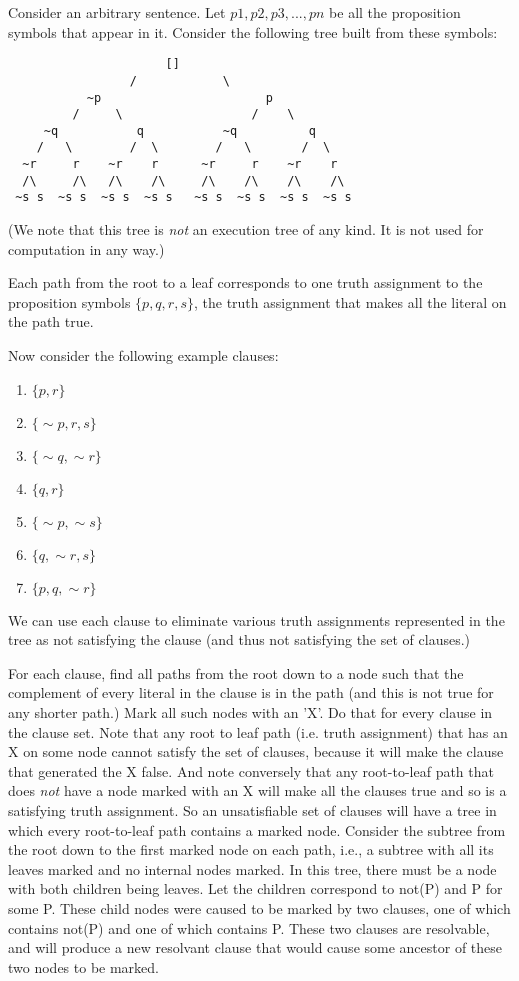 Consider an arbitrary sentence.  Let $p1, p2, p3, ..., pn$ be all the
proposition symbols that appear in it.  Consider the following tree
built from these symbols:

\begin{verbatim}
                      []
                 /            \
           ~p                       p
         /     \                  /    \
     ~q           q           ~q          q
    /   \        /  \        /   \       /  \
  ~r     r    ~r    r      ~r     r    ~r    r
  /\     /\   /\    /\     /\    /\    /\    /\
 ~s s  ~s s  ~s s  ~s s   ~s s  ~s s  ~s s  ~s s 
\end{verbatim}

(We note that this tree is {\em not} an execution tree of any kind.
It is not used for computation in any way.)

Each path from the root to a leaf corresponds to one truth assignment
to the proposition symbols $\{p,q,r,s\}$, the truth assignment that
makes all the literal on the path true.

Now consider the following example clauses:
\begin{enumerate}
\item $\{p, r\}$
\item $\{\sim p, r, s\}$
\item $\{\sim q, \sim r\}$
\item $\{q, r\}$
\item $\{\sim p, \sim s\}$
\item $\{q, \sim r, s\}$
\item $\{p, q, \sim r\}$
\end{enumerate}

We can use each clause to eliminate various truth assignments
represented in the tree as not satisfying the clause (and thus not
satisfying the set of clauses.)

For each clause, find all paths from the root down to a node such that
the complement of every literal in the clause is in the path (and this
is not true for any shorter path.)  Mark all such nodes with an 'X'.
Do that for every clause in the clause set.  Note that any root to
leaf path (i.e. truth assignment) that has an X on some node cannot
satisfy the set of clauses, because it will make the clause that
generated the X false.  And note conversely that any root-to-leaf path
that does {\em not} have a node marked with an X will make all the
clauses true and so is a satisfying truth assignment.  So an
unsatisfiable set of clauses will have a tree in which every
root-to-leaf path contains a marked node.  Consider the subtree from
the root down to the first marked node on each path, i.e., a subtree
with all its leaves marked and no internal nodes marked.  In this
tree, there must be a node with both children being leaves.  Let the
children correspond to not(P) and P for some P.  These child nodes
were caused to be marked by two clauses, one of which contains not(P)
and one of which contains P.  These two clauses are resolvable, and
will produce a new resolvant clause that would cause some ancestor of
these two nodes to be marked.

